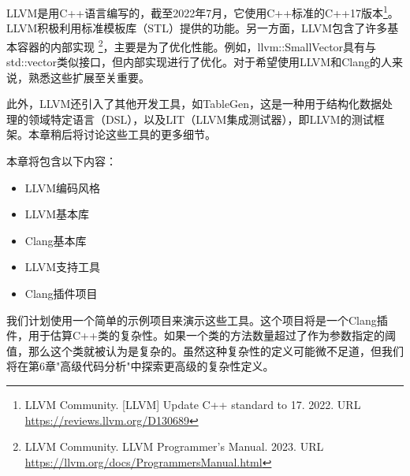 LLVM是用C++语言编写的，截至2022年7月，它使用C++标准的C++17版本\footnote{LLVM Community. [LLVM] Update C++ standard to 17. 2022. URL \url{https://reviews.llvm.org/D130689}}。LLVM积极利用标准模板库（STL）提供的功能。另一方面，LLVM包含了许多基本容器的内部实现 \footnote{LLVM Community. LLVM Programmer's Manual. 2023. URL \url{https://llvm.org/docs/ProgrammersManual.html}}，主要是为了优化性能。例如，llvm::SmallVector具有与std::vector类似接口，但内部实现进行了优化。对于希望使用LLVM和Clang的人来说，熟悉这些扩展至关重要。

此外，LLVM还引入了其他开发工具，如TableGen，这是一种用于结构化数据处理的领域特定语言（DSL），以及LIT（LLVM集成测试器），即LLVM的测试框架。本章稍后将讨论这些工具的更多细节。

本章将包含以下内容：

\begin{itemize}
\item
LLVM编码风格

\item
LLVM基本库

\item
Clang基本库

\item
LLVM支持工具

\item
Clang插件项目
\end{itemize}

我们计划使用一个简单的示例项目来演示这些工具。这个项目将是一个Clang插件，用于估算C++类的复杂性。如果一个类的方法数量超过了作为参数指定的阈值，那么这个类就被认为是复杂的。虽然这种复杂性的定义可能微不足道，但我们将在第6章"高级代码分析"中探索更高级的复杂性定义。
